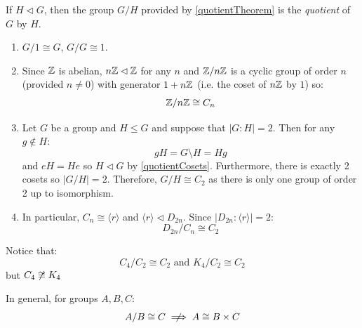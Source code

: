 \documentclass[../main.tex]{subfiles}
\begin{document}
\begin{definition}
  If $H \lhd G$, then the group $G / H$ provided by \cref{quotientTheorem} is the \textit{quotient} of $G$ by $H$.
\end{definition}
\begin{example}
  \label{quotientExamples}
  \begin{enumerate}
    \item $G / 1 \cong G$, $G / G \cong 1$.
    \item Since $\mathbb{Z}$ is abelian, $n\mathbb{Z} \lhd \mathbb{Z}$ for any $n$ and $\mathbb{Z}/n\mathbb{Z}$ is a cyclic group of order $n$ (provided $n \neq 0$) with generator $1 + n\mathbb{Z}$ (i.e. the coset of $n\mathbb{Z}$ by $1$) so:
      \[
        \mathbb{Z} / n\mathbb{Z} \cong C_n
      \]
    \item Let $G$ be a group and $H \leq G$ and suppose that $|G:H| = 2$.
      Then for any $g \notin H$:
      \[
        gH = G \setminus H = Hg
      \]
      and $eH = He$ so $H \lhd G$ by \cref{quotientCosets}.
      Furthermore, there is exactly 2 cosets so $|G / H| = 2$.
      Therefore, $G /H \cong C_2$ as there is only one group of order 2 up to isomorphism.
    \item In particular, $C_n \cong \langle r \rangle$ and $\langle r \rangle \lhd D_{2n}$.
      Since $|D_{2n} : \langle r \rangle| = 2$:
      \[
        D_{2n} / C_n \cong C_2
      \]
  \end{enumerate}
\end{example}
\begin{remark}[Warning]
Notice that:
\[
  C_4 / C_2 \cong C_2 \text{ and } K_4 / C_2 \cong C_2
\]
but $C_4 \centernot\cong K_4$

In general, for groups $A, B, C$:
\[
  A / B \cong C \centernot\implies A \cong B \times C
\]
\end{remark}
\end{document}
